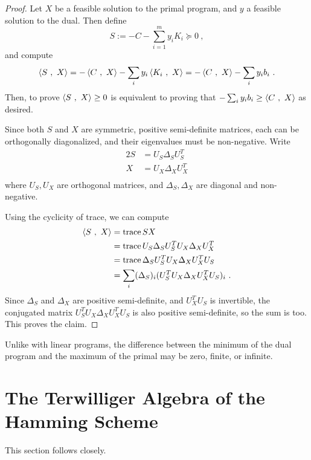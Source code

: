 \documentclass{report}
\begin{document}
    \begin{proof}
      Let $X$ be a feasible solution to the primal program, and $y$ a feasible
      solution to the dual.  Then define
      $$
        S := -C - \sum_{i=1}^m y_i K_i \succeq 0 \ ,
      $$
      and compute
      $$
        \left\langle  S \ , \ X  \right\rangle
        = -\left\langle  C \ , \ X  \right\rangle - \sum_i y_i \left\langle  K_i \ , \ X  \right\rangle
        = -\left\langle  C \ , \ X  \right\rangle - \sum_i y_i b_i \ .
      $$
      Then, to prove $\left\langle  S \ , \ X  \right\rangle \geq 0$ is equivalent to proving that
      $-\sum_i y_i b_i \geq \left\langle  C \ , \ X  \right\rangle$ as desired.

      Since both $S$ and $X$ are symmetric, positive semi-definite matrices,
      each can be orthogonally diagonalized, and their eigenvalues must be
      non-negative.  Write
      \begin{alignat*}{2}
        S &= U_S \Delta_S U_S^T \\
        X &= U_X \Delta_X U_X^T \\
      \end{alignat*}
      where $U_S, U_X$ are orthogonal matrices, and $\Delta_S, \Delta_X$ are
      diagonal and non-negative.

      Using the cyclicity of trace, we can compute
      \begin{alignat*}{2}
        \left\langle  S \ , \ X  \right\rangle &= \operatorname{trace} SX \\
        &= \operatorname{trace} U_S \Delta_S U_S^T U_X \Delta_X U_X^T \\
        &= \operatorname{trace} \Delta_S U_S^T U_X \Delta_X U_X^T U_S \\
        &= \sum_i (\Delta_S)_i (U_S^T U_X \Delta_X U_X^T U_S)_i \ .
      \end{alignat*}
      Since $\Delta_S$ and $\Delta_X$ are positive semi-definite, and $U_X^T
      U_S$ is invertible, the conjugated matrix $U_S^T U_X \Delta_X U_X^T U_S$
      is also positive semi-definite, so the sum is too.  This proves the claim.
    \end{proof}

    Unlike with linear programs, the difference between the minimum of the dual
    program and the maximum of the primal may be zero, finite, or infinite.

  \section{The Terwilliger Algebra of the Hamming
    Scheme}\label{sec:SDP-bound:terwilliger}

    This section follows \cite[Subsection I. A]{schrijver} closely.
    \\
\end{document}
